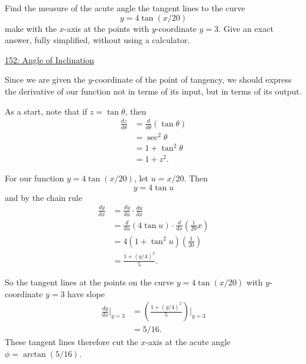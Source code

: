 \documentclass{ximera}
\begin{document}
\begin{question}  \label{QJKDF3erdfsmdf}
Find the measure of the acute angle the tangent lines to the curve
\[
    y = 4 \tan(x/20)
\]
make with the $x$-axis at the points with $y$-coordinate $y=3$. Give an exact answer, fully simplified, without using a calculator.

\begin{onlineOnly}
    \begin{center}
\end{center}
\end{onlineOnly}

\href{https://www.desmos.com/calculator/df7hjgabzb}{152: Angle of Inclination}


\begin{explanation}
Since we are given the $y$-coordinate of the point of tangency, we should express the derivative of our function not in terms of its input, but in terms of its output.

As a start, note that if $z=\tan\theta$, then
\begin{align*}
     \frac{dz}{d\theta} &= \frac{d}{d\theta}\left( \tan\theta  \right) \\
                                &= \sec^2\theta \\
                                 &= 1 + \tan^2\theta \\
                                 &= 1 + z^2 . 
\end{align*}

For our function $y=4\tan(x/20)$, let $u=x/20$. Then
\[
  y = 4 \tan u      
\]
and by the chain rule
\begin{align*}
         \frac{dy}{dx} &= \frac{dy}{du} \cdot \frac{du}{dx} \\
                                    &= \frac{d}{du} (4\tan u) \cdot \frac{d}{dx}\left( \frac{1}{20}x \right) \\
                                    &= 4 (1+\tan^2 u) \left( \frac{1}{20} \right) \\
                                    &=\frac{1+(y/4)^2}{5} .
\end{align*}

So the tangent lines at the points on the curve $y=4\tan(x/20)$ with $y$-coordinate $y=3$ have slope
\begin{align*}
  \frac{dy}{dx}\Big|_{y=3} &= \left( \frac{1+(y/4)^2}{5}\right) \Big|_{y=3} \\
                                       &= 5/16.
\end{align*}
These tangent lines therefore cut the $x$-axis at the acute angle $\phi =\arctan(5/16)$.

\end{explanation}


\end{question}
\end{document}
